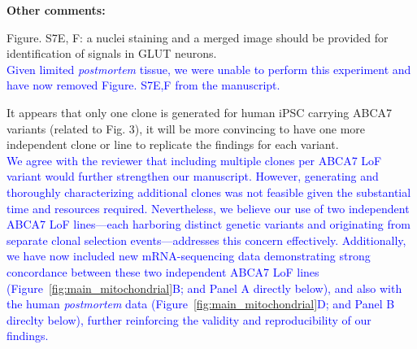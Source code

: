 
\textbf{Other comments:}

Figure. S7E, F: a nuclei staining and a merged image should be provided for identification of signals in GLUT neurons.\\
\textcolor{blue}{Given limited \textit{postmortem} tissue, we were unable to perform this experiment and have now removed Figure. S7E,F from the manuscript.}

It appears that only one clone is generated for human iPSC carrying ABCA7 variants (related to Fig. 3), it will be more convincing to have one more independent clone or line to replicate the findings for each variant.\\
\textcolor{blue}{We agree with the reviewer that including multiple clones per ABCA7 LoF variant would further strengthen our manuscript. However, generating and thoroughly characterizing additional clones was not feasible given the substantial time and resources required. Nevertheless, we believe our use of two independent ABCA7 LoF lines—each harboring distinct genetic variants and originating from separate clonal selection events—addresses this concern effectively. Additionally, we have now included new mRNA-sequencing data demonstrating strong concordance between these two independent ABCA7 LoF lines (Figure~\ref{fig:main_mitochondrial}B; and Panel A directly below), and also with the human \textit{postmortem} data (Figure~\ref{fig:main_mitochondrial}D; and Panel B direclty below), further reinforcing the validity and reproducibility of our findings.}


